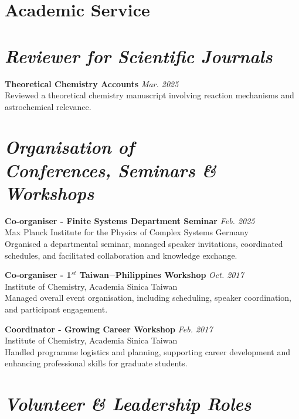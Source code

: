 \section{\sc Academic Service}

\vspace{35pt}
\section{\sl Reviewer for Scientific Journals}
{\bf Theoretical Chemistry Accounts}  \hfill \textit{Mar. 2025}\\ 
Reviewed a theoretical chemistry manuscript involving reaction mechanisms and astrochemical relevance.

\section{\sl Organisation of \\ Conferences, Seminars \&  Workshops}

{\bf Co-organiser - Finite Systems Department Seminar}  \hfill \textit{Feb. 2025}\\ 
Max Planck Institute for the Physics of Complex Systems \hfill Germany \\
Organised a departmental seminar, managed speaker invitations, coordinated schedules, and facilitated collaboration and knowledge exchange.

   
{\bf Co-organiser - 1$^{st}$ Taiwan$-$Philippines Workshop} \hfill \textit{Oct. 2017} \\
Institute of Chemistry, Academia Sinica \hfill Taiwan \\
Managed overall event organisation, including scheduling, speaker coordination, and participant engagement.

{\bf Coordinator - Growing Career Workshop} \hfill \textit{Feb. 2017} \\
Institute of Chemistry, Academia Sinica \hfill Taiwan \\
Handled programme logistics and planning, supporting career development and enhancing professional skills for graduate students.

\section{\sl Volunteer \&  Leadership Roles}

